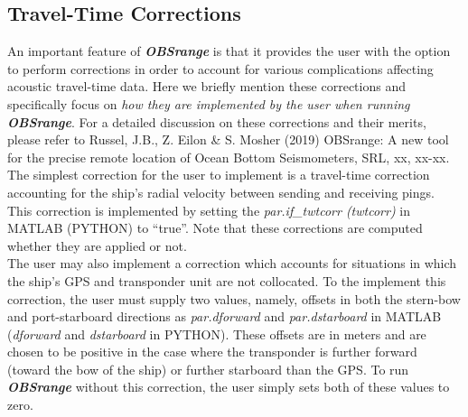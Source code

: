 \documentclass[titlepage, 12pt]{article}
\begin{document}
  \newpage
  
  \subsection{Travel-Time Corrections}
   \label{subsection:TTCs}

   An important feature of \textbf{\textit{OBSrange}} is that it provides the user with the option to perform corrections in order to account for various complications affecting acoustic travel-time data. Here we briefly mention these corrections and specifically focus on \textit{how they are implemented by the user when running \textbf{OBSrange}}. For a detailed discussion on these corrections and their merits, please refer to Russel, J.B., Z. Eilon \& S. Mosher (2019) OBSrange: A new tool for the precise remote location of Ocean Bottom Seismometers, SRL, xx, xx-xx.\\

   The simplest correction for the user to implement is a travel-time correction accounting for the ship's radial velocity between sending and receiving pings. This correction is implemented by setting the \textit{par.if\_twtcorr (twtcorr)} in MATLAB (PYTHON) to ``true''. Note that these corrections are computed whether they are applied or not.\\ 
   
   The user may also implement a correction which accounts for situations in which the ship's GPS and transponder unit are not collocated. To the implement this correction, the user must supply two values, namely, offsets in both the stern-bow and port-starboard directions as \textit{par.dforward} and \textit{par.dstarboard} in MATLAB (\textit{dforward} and \textit{dstarboard} in PYTHON). These offsets are in meters and are chosen to be positive in the case where the transponder is further forward (toward the bow of the ship) or further starboard than the GPS. To run \textbf{\textit{OBSrange}} without this correction, the user simply sets both of these values to zero.\\
\end{document}
